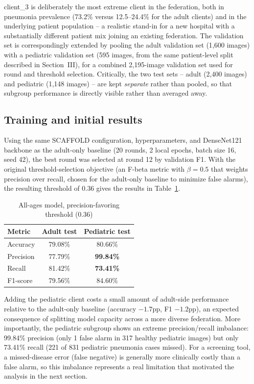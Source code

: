 \documentclass[conference]{IEEEtran}
\begin{document}
client\_3 is deliberately the most extreme client in the federation, both in
pneumonia prevalence (73.2\% versus 12.5--24.4\% for the adult clients) and
in the underlying patient population -- a realistic stand-in for a new
hospital with a substantially different patient mix joining an existing
federation. The validation set is correspondingly extended by pooling the
adult validation set (1{,}600 images) with a pediatric validation set
(595 images, from the same patient-level split described in Section~III),
for a combined 2{,}195-image validation set used for round and threshold
selection. Critically, the two test sets -- adult (2{,}400 images) and
pediatric (1{,}148 images) -- are kept \emph{separate} rather than pooled,
so that subgroup performance is directly visible rather than averaged away.

\subsection{Training and initial results}

Using the same SCAFFOLD configuration, hyperparameters, and DenseNet121
backbone as the adult-only baseline (20 rounds, 2 local epochs, batch size
16, seed 42), the best round was selected at round 12 by validation F1. With
the original threshold-selection objective (an F-beta metric with
$\beta=0.5$ that weights precision over recall, chosen for the adult-only
baseline to minimize false alarms), the resulting threshold of 0.36 gives
the results in Table~\ref{tab:initial-allages}.

\begin{table}[htbp]
\caption{All-ages model, precision-favoring threshold (0.36)}
\begin{center}
\begin{tabular}{lcc}
\toprule
\textbf{Metric} & \textbf{Adult test} & \textbf{Pediatric test} \\
\midrule
Accuracy  & 79.08\% & 80.66\% \\
Precision & 77.79\% & \textbf{99.84\%} \\
Recall    & 81.42\% & \textbf{73.41\%} \\
F1-score  & 79.56\% & 84.60\% \\
\bottomrule
\end{tabular}
\label{tab:initial-allages}
\end{center}
\end{table}

Adding the pediatric client costs a small amount of adult-side performance
relative to the adult-only baseline (accuracy $-1.7$pp, F1 $-1.2$pp), an
expected consequence of splitting model capacity across a more diverse
federation. More importantly, the pediatric subgroup shows an extreme
precision/recall imbalance: 99.84\% precision (only 1 false alarm in 317
healthy pediatric images) but only 73.41\% recall (221 of 831 pediatric
pneumonia cases missed). For a screening tool, a missed-disease error
(false negative) is generally more clinically costly than a false alarm, so
this imbalance represents a real limitation that motivated the analysis in
the next section.
\end{document}
